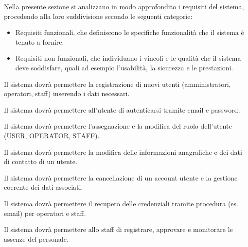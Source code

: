 \documentclass[a4paper]{report}
\begin{document}

Nella presente sezione si analizzano in modo approfondito i requisiti del sistema, procedendo alla loro suddivisione secondo le seguenti categorie:
\begin{itemize}
    \item Requisiti funzionali, che definiscono le specifiche funzionalità che il sistema è tenuto a fornire.
    \item Requisiti non funzionali, che individuano i vincoli e le qualità che il sistema deve soddisfare, quali ad esempio l'usabilità, la sicurezza e le prestazioni.
\end{itemize}




Il sistema dovrà permettere la registrazione di nuovi utenti (amministratori, operatori, staff) inserendo i dati necessari.


Il sistema dovrà permettere all’utente di autenticarsi tramite email e password.


Il sistema dovrà permettere l’assegnazione e la modifica del ruolo dell’utente (USER, OPERATOR, STAFF).


Il sistema dovrà permettere la modifica delle informazioni anagrafiche e dei dati di contatto di un utente.


Il sistema dovrà permettere la cancellazione di un account utente e la gestione coerente dei dati associati.


Il sistema dovrà permettere il recupero delle credenziali tramite procedura (es. email) per operatori e staff.



Il sistema dovrà permettere allo staff di registrare, approvare e monitorare le assenze del personale.
\end{document}
